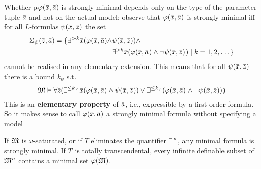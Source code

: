 \documentclass[11pt]{article}
\begin{document}
Whether p\(\varphi(\barx,\bara)\) is strongly minimal depends only on the type of the parameter
tuple \(\bara\) and not on the actual model: observe that \(\varphi(\barx,\bara)\) is strongly minimal
iff for all \(L\)-formulas \(\psi(\barx,\barz)\) the set
\begin{align*}
\Sigma_\psi(\barz,\bara)=\{\exists^{>k}\barx(\varphi(\barx,\bara)\wedge&\psi(\barx,\barz))\wedge\\
&\exists^{>k}\barx(\varphi(\barx,\bara)\wedge\neg\psi(\barx,\barz))\mid k=1,2,\dots\}
\end{align*}
cannot be realised in any elementary extension. This means that for all \(\psi(\barx,\barz)\) there
is a bound \(k_\psi\) s.t.
\begin{equation*}
\fM\vDash\forall\barz(\exists^{\le k_\psi}\barx(\varphi(\barx,\bara)\wedge\psi(\barx,\barz))\vee\exists^{\le k_\psi}(\varphi(\barx,\bara)\wedge\neg\psi(\barx,\barz)))
\end{equation*}
This is an \textbf{elementary property} of \(\bara\), i.e., expressible by a first-order formula. So it
makes sense to call \(\varphi(\barx,\bara)\) a strongly minimal formula without specifying a model


\begin{lemma}[]
If \(\mathfrak{M}\) is \(\omega\)-saturated, or if \(T\) eliminates the quantifier \(\exists^\infty\), any minimal formula is
strongly minimal. If \(T\) is totally transcendental, every infinite definable subset of \(\mathfrak{M}^n\)
contains a minimal set \(\varphi(\mathfrak{M})\).
\end{lemma}
\end{document}
